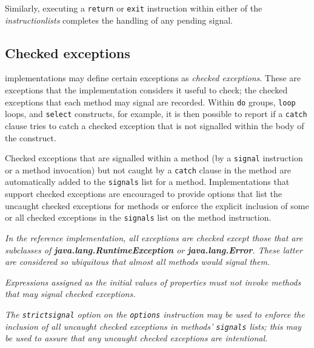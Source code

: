 Similarly, executing a \texttt{return}
or \texttt{exit} instruction within either of the
\emph{instructionlists} completes the handling of any pending
signal.
\subsection{Checked exceptions}\label{refchecked}
 
\nr{} implementations may define certain exceptions as \emph{checked
exceptions}.  These are exceptions that the implementation considers
it useful to check; the checked exceptions that each method may signal
are recorded.  Within \texttt{do} groups, \texttt{loop} loops, and
\texttt{select} constructs, for example, it is then possible to report
if a \texttt{catch} clause tries to catch a checked exception that is
not signalled within the body of the construct.
 
Checked exceptions that are signalled within a method (by a
\texttt{signal} instruction or a method invocation) but not caught by a
\texttt{catch} clause in the method are automatically added to the
\texttt{signals} list for a method.  Implementations that support
checked exceptions are encouraged to provide options that list the
uncaught checked exceptions for methods or enforce the explicit
inclusion of some or all checked exceptions in the \texttt{signals} list
on the method instruction.
 
\emph{In the reference implementation, all exceptions are checked except
those that are subclasses of \textbf{java.lang.RuntimeException}
or \textbf{java.lang.Error}.  These latter are considered so
ubiquitous that almost all methods would signal them.}
 
\emph{Expressions assigned as the initial values of properties must not invoke
methods that may signal checked exceptions.}
 
\emph{The \texttt{strictsignal} option on the \texttt{options} instruction may
be used to enforce the inclusion of all uncaught checked exceptions in
methods' \texttt{signals} lists; this may be used to assure that
any uncaught checked exceptions are intentional.}
